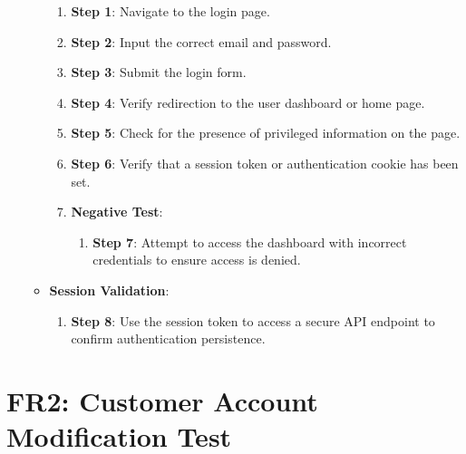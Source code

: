 \documentclass[12pt, titlepage]{article}
\begin{document}
\begin{enumerate}
\begin{itemize}
        \begin{enumerate}
            \item \textbf{Step 1}: Navigate to the login page.
            \item \textbf{Step 2}: Input the correct email and password.
            \item \textbf{Step 3}: Submit the login form.
            \item \textbf{Step 4}: Verify redirection to the user dashboard or home page.
            \item \textbf{Step 5}: Check for the presence of privileged information on the page.
            \item \textbf{Step 6}: Verify that a session token or authentication cookie has been set.
            \item \textbf{Negative Test}:
            \begin{enumerate}
                \item \textbf{Step 7}: Attempt to access the dashboard with incorrect credentials to ensure access is denied.
            \end{enumerate}
        \end{enumerate}
        \item \textbf{Session Validation}:
        \begin{enumerate}
            \item \textbf{Step 8}: Use the session token to access a secure API endpoint to confirm authentication persistence.
        \end{enumerate}
    \end{itemize}
\end{enumerate}

\section*{FR2: Customer Account Modification Test}
\end{document}

